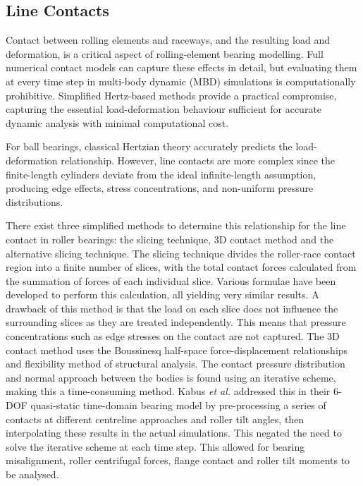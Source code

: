 \subsection{Line Contacts}

Contact between rolling elements and raceways, and the resulting load and deformation, is a critical aspect of rolling-element bearing modelling. Full numerical contact models can capture these effects in detail, but evaluating them at every time step in multi-body dynamic (MBD) simulations is computationally prohibitive. Simplified Hertz-based methods provide a practical compromise, capturing the essential load-deformation behaviour sufficient for accurate dynamic analysis with minimal computational cost.

For ball bearings, classical Hertzian theory accurately predicts the load-deformation relationship. However, line contacts are more complex since the finite-length cylinders deviate from the ideal infinite-length assumption, producing edge effects, stress concentrations, and non-uniform pressure distributions.

There exist three simplified methods to determine this relationship for the line contact in roller bearings: the slicing technique, 3D contact method and the alternative slicing technique. The slicing technique \cite{Andreason1973} divides the roller-race contact region into a finite number of slices, with the total contact forces calculated from the summation of forces of each individual slice. Various formulae have been developed to perform this calculation, all yielding very similar results. A drawback of this method is that the load on each slice does not influence the surrounding slices as they are treated independently. This means that pressure concentrations such as edge stresses on the contact are not captured. The 3D contact method uses the Boussinesq half-space force-displacement relationships and flexibility method of structural analysis. The contact pressure distribution and normal approach between the bodies is found using an iterative scheme, making this a time-consuming method. Kabus \textit{et al.} \cite{Kabus2012} addressed this in their 6-DOF quasi-static time-domain bearing model by pre-processing a series of contacts at different centreline approaches  and roller tilt angles, then interpolating these results in the actual simulations. This negated the need to solve the iterative scheme at each time step. This allowed for bearing misalignment, roller centrifugal forces, flange contact and roller tilt moments to be analysed. 

